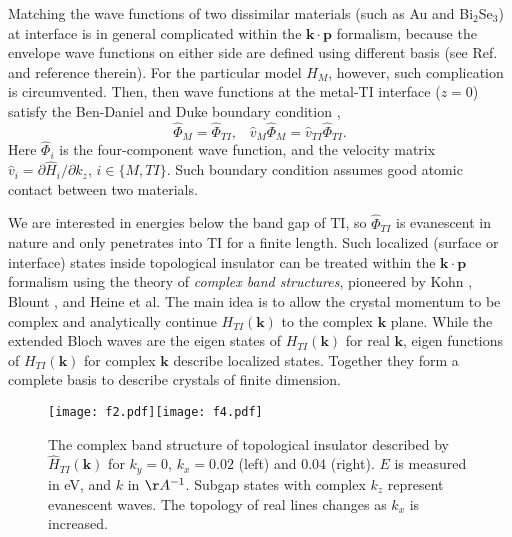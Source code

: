 \documentclass[11pt]{report}
\def\v#1{\mathbf{#1}}
\begin{document}
Matching the wave functions of two dissimilar 
materials (such as Au and Bi$_2$Se$_3$) at interface is in general 
complicated within the $\mathbf{k\cdot p}$ formalism, because the envelope wave functions 
on either side are defined using different basis (see Ref.  and reference therein). 
For the particular model $H_M$, however, such complication
is circumvented. Then, then wave functions at the metal-TI interface ($z=0$) satisfy the Ben-Daniel 
and Duke boundary condition \cite{duke}, 
\[
\hat{\Phi}_M=\hat{\Phi}_{TI}, \;\;\; \hat{v}_M \hat{\Phi}_M = \hat{v}_{TI}\hat{\Phi}_{TI}.
\]
Here $\hat{\Phi}_i$ is the four-component wave function, and 
the velocity matrix $\hat{v}_{i}=\partial \hat{H}_i/\partial k_z$, $i\in \{M, TI\}$. 
Such boundary condition assumes good atomic contact between two materials.

We are interested in energies below the band gap of TI, so 
$\hat{\Phi}_{TI}$ is evanescent in nature and only penetrates into TI 
for a finite length. Such localized (surface or interface) 
states inside topological insulator can be treated within the $\mathbf{k\cdot p}$ formalism 
using the theory of {\it complex band structures}, pioneered by Kohn \cite{kohn59}, Blount \cite{blount62}, 
and Heine \cite{heine63} et al. 
The main idea is to allow the crystal momentum to be complex and analytically continue
$H_{TI}(\v{k})$ to the complex $\v{k}$ plane. 
While the extended Bloch waves are the eigen states of $H_{TI}(\v{k})$ for real $\v{k}$, 
eigen functions of $H_{TI}(\v{k})$ for complex $\v{k}$ describe localized states. Together they
form a complete basis to describe crystals of finite dimension. 

\begin{figure}
\texttt{[image: f2.pdf]}\texttt{[image: f4.pdf]}
\caption{The complex band structure
of topological insulator described by $\hat{H}_{TI}(\v{k})$ 
for $k_y=0$, $k_x=0.02$ (left) and $0.04$ (right). $E$ is measured in eV, and $k$ in $\AA^{-1}$.
Subgap states with complex $k_z$ represent evanescent waves. 
The topology of  real lines \cite{heine63}  changes as $k_x$ is increased.  
}
\end{figure}
\end{document}
